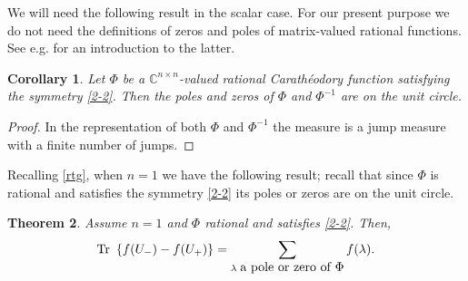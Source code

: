 \documentclass[12pt]{amsart}
\newtheorem{thm}{Theorem}[section]
\newtheorem{cor}[thm]{Corollary}
\theoremstyle{definition}
\theoremstyle{remark}
\numberwithin{equation}{section}
\begin{document}
We will need the following result in the scalar case. For our present purpose we do not need the definitions of zeros and poles of matrix-valued rational functions.
See e.g. \cite{kaash-field} for an introduction to the latter.


\begin{cor}
  Let $\Phi$ be a $\mathbb C^{n\times n}$-valued rational Carath\'eodory function satisfying the symmetry \eqref{2-2}. Then the poles and zeros of $\Phi$ and $\Phi^{-1}$ are on the
  unit circle.
\end{cor}

\begin{proof}
In the representation of both $\Phi$ and $\Phi^{-1}$ the measure is a jump measure with a finite number of jumps.
  \end{proof}

Recalling \eqref{rtg}, when $n=1$ we have the following result; recall that since $\Phi$ is rational and satisfies the symmetry \eqref{2-2} its poles or zeros are on the unit circle.
        \begin{thm}
          \label{ththth}
          Assume $n=1$ and $\Phi$ rational and satisfies \eqref{2-2}. Then,
        \begin{equation}
          {\rm Tr}\,\,\left\{ f(U_-)-f(U_+)\right\}=\sum_{\lambda \,\,\mbox{\rm a pole or zero of $\Phi$}} f(\lambda).
        \end{equation}
      \end{thm}
\end{document}
